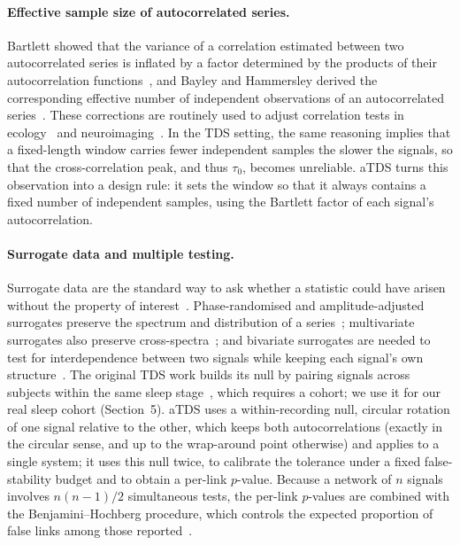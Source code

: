\documentclass[11pt,a4paper]{article}
\begin{document}
\paragraph{Effective sample size of autocorrelated series.}
Bartlett showed that the variance of a correlation estimated between two autocorrelated series is inflated by a factor determined by the products of their autocorrelation functions~\cite{Bartlett1946TheoreticalSpecification}, and Bayley and Hammersley derived the corresponding effective number of independent observations of an autocorrelated series~\cite{Bayley1946EffectiveNumber}. These corrections are routinely used to adjust correlation tests in ecology~\cite{Pyper1998ComparisonMethods} and neuroimaging~\cite{Afyouni2019EffectiveDegrees}. In the TDS setting, the same reasoning implies that a fixed-length window carries fewer independent samples the slower the signals, so that the cross-correlation peak, and thus $\tau_0$, becomes unreliable. aTDS turns this observation into a design rule: it sets the window so that it always contains a fixed number of independent samples, using the Bartlett factor of each signal's autocorrelation.

\paragraph{Surrogate data and multiple testing.}
Surrogate data are the standard way to ask whether a statistic could have arisen without the property of interest~\cite{Theiler1992TestingNonlinearity,Schreiber2000SurrogateTime,Lancaster2018SurrogateData}. Phase-randomised and amplitude-adjusted surrogates preserve the spectrum and distribution of a series~\cite{Theiler1992TestingNonlinearity,Schreiber1996ImprovedSurrogate}; multivariate surrogates also preserve cross-spectra~\cite{Prichard1994GeneratingSurrogate}; and bivariate surrogates are needed to test for interdependence between two signals while keeping each signal's own structure~\cite{Andrzejak2003BivariateSurrogate}. The original TDS work builds its null by pairing signals across subjects within the same sleep stage~\cite{Bashan2012NetworkPhysiology}, which requires a cohort; we use it for our real sleep cohort (Section~5). aTDS uses a within-recording null, circular rotation of one signal relative to the other, which keeps both autocorrelations (exactly in the circular sense, and up to the wrap-around point otherwise) and applies to a single system; it uses this null twice, to calibrate the tolerance under a fixed false-stability budget and to obtain a per-link $p$-value. Because a network of $n$ signals involves $n(n-1)/2$ simultaneous tests, the per-link $p$-values are combined with the Benjamini--Hochberg procedure, which controls the expected proportion of false links among those reported~\cite{Benjamini1995ControllingFalse}.
\end{document}
